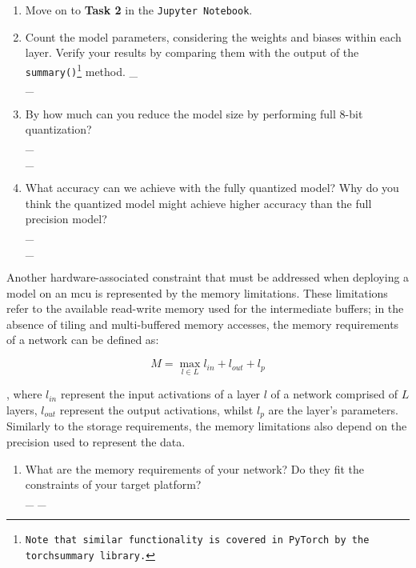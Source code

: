 \documentclass[parskip=half,notes,cadrem,toolver]{iisvlsi}
\begin{document}
\begin{studtask}
\begin{enumerate}
    \item Move on to \textbf{Task 2} in the \texttt{Jupyter Notebook}.
    \item Count the model parameters, considering the weights and biases within each layer. Verify your results by comparing them with the output of the \texttt{summary()\footnote{Note that similar functionality is covered in PyTorch by the \texttt{torchsummary} library.}} method. \newline
    \_\answerrule \\
    \_\answerrule \\
    \item By how much can you reduce the model size by performing full 8-bit quantization? \\
    \_\answerrule \\
    \_\answerrule \\
    \item What accuracy can we achieve with the fully quantized model? Why do you think the quantized model might achieve higher accuracy than the full precision model? \\
    \_\answerrule \\
    \_\answerrule \\
\end{enumerate}

\end{studtask}

Another hardware-associated constraint that must be addressed when deploying a model on an \gls{mcu} is represented by the memory limitations. These limitations refer to the available read-write memory used for the intermediate buffers; in the absence of tiling and multi-buffered memory accesses, the memory requirements of a network can be defined as:

\begin{equation}
M = \max_{l \in L}{l_{in} + l_{out} + l_{p}}
\end{equation}

, where $l_{in}$ represent the input activations of a layer $l$ of a network comprised of $L$ layers, $l_{out}$ represent the output activations, whilst $l_{p}$ are the layer's parameters. Similarly to the storage requirements, the memory limitations also depend on the precision used to represent the data.

\begin{studtask}
\begin{enumerate}
    \item What are the memory requirements of your network? Do they fit the constraints of your target platform?  \\
    \_\answerrule
    \_\answerrule
\end{enumerate}
\end{studtask}
\end{document}

